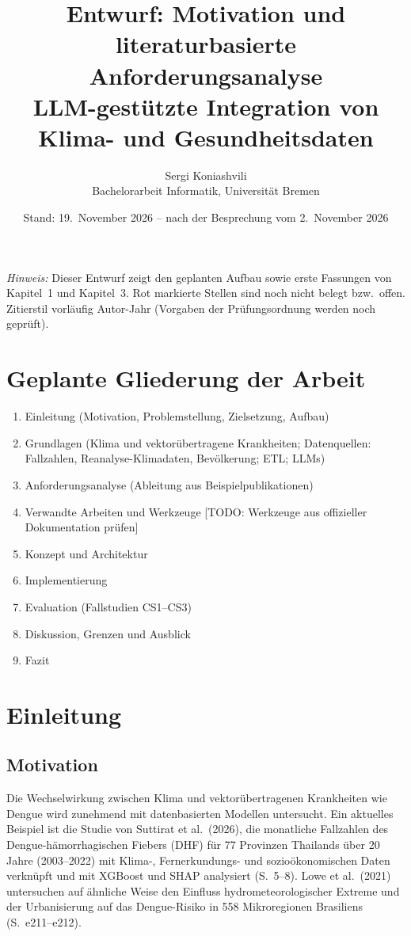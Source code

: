 \documentclass[11pt,a4paper]{article}
\title{Entwurf: Motivation und literaturbasierte Anforderungsanalyse\\[0.3em]
\large LLM-gestützte Integration von Klima- und Gesundheitsdaten}
\author{Sergi Koniashvili\\ Bachelorarbeit Informatik, Universität Bremen}
\date{Stand: 19.~November 2026 -- nach der Besprechung vom 2.~November 2026}
\newcommand{\todo}[1]{\textcolor{red!70!black}{[TODO: #1]}}
\begin{document}
\maketitle

\noindent\textit{Hinweis:} Dieser Entwurf zeigt den geplanten Aufbau sowie erste
Fassungen von Kapitel~1 und Kapitel~3. Rot markierte Stellen sind noch nicht
belegt bzw.\ offen. Zitierstil vorläufig Autor-Jahr (Vorgaben der
Prüfungsordnung werden noch geprüft).

\section*{Geplante Gliederung der Arbeit}
\begin{enumerate}[nosep]
  \item Einleitung (Motivation, Problemstellung, Zielsetzung, Aufbau)
  \item Grundlagen (Klima und vektorübertragene Krankheiten; Datenquellen:
        Fallzahlen, Reanalyse-Klimadaten, Bevölkerung; ETL; LLMs)
  \item Anforderungsanalyse (Ableitung aus Beispielpublikationen)
  \item Verwandte Arbeiten und Werkzeuge \todo{Werkzeuge aus offizieller Dokumentation prüfen}
  \item Konzept und Architektur
  \item Implementierung
  \item Evaluation (Fallstudien CS1--CS3)
  \item Diskussion, Grenzen und Ausblick
  \item Fazit
\end{enumerate}

\section{Einleitung}

\subsection{Motivation}

Die Wechselwirkung zwischen Klima und vektorübertragenen Krankheiten wie Dengue
wird zunehmend mit datenbasierten Modellen untersucht. Ein aktuelles Beispiel
ist die Studie von Suttirat et al.\ (2026), die monatliche Fallzahlen des
Dengue-hämorrhagischen Fiebers (DHF) für 77 Provinzen Thailands über 20 Jahre
(2003--2022) mit Klima-, Fernerkundungs- und sozioökonomischen Daten verknüpft
und mit XGBoost und SHAP analysiert (S.~5--8). Lowe et al.\ (2021) untersuchen
auf ähnliche Weise den Einfluss hydrometeorologischer Extreme und der
Urbanisierung auf das Dengue-Risiko in 558 Mikroregionen Brasiliens
(S.~e211--e212).
\end{document}
